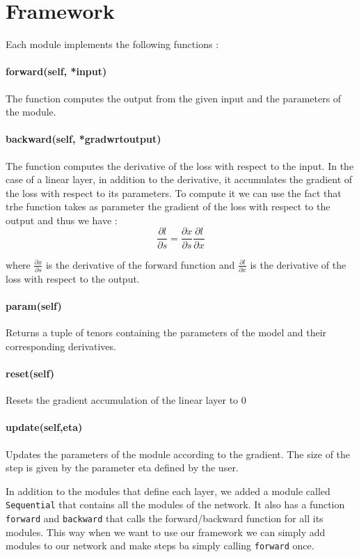 \documentclass{article}
\begin{document}
\thispagestyle{fancy}

\section{Framework}

Each module implements the following functions : 

\paragraph{forward(self, *input)}
The function computes the output from the given input and the parameters of the module.
    
\paragraph{backward(self, *gradwrtoutput)}
The function computes the derivative of the loss with respect to the input. In the case of a linear layer, in addition to the derivative, it accumulates the gradient of the loss with respect to its parameters. To compute it we can use the fact that trhe function takes as parameter the gradient of the loss with respect to the output and thus we have : 
\[\frac{\partial l}{\partial s} = \frac{\partial x}{\partial s} \frac{\partial l}{\partial x}\] 

where $\frac{\partial x}{\partial s}$ is the derivative of the forward function and $\frac{\partial l}{\partial x}$ is the derivative of the loss with respect to the output.

\paragraph{param(self)}
Returns a tuple of tenors containing the parameters of the model and their corresponding derivatives. 
    
\paragraph{reset(self)}
Resets the gradient accumulation of the linear layer to 0
    
\paragraph{update(self,eta)}
Updates the parameters of the module according to the gradient. The size of the step is given by the parameter eta defined by the user. 


In addition to the modules that define each layer, we added a module called \verb|Sequential| that contains all the modules of the network. It also has a function \verb|forward| and \verb|backward| that calls the forward/backward function for all its modules. This way when we want to use our framework we can simply add modules to our network and make steps ba simply calling \verb|forward| once. 
\end{document}
